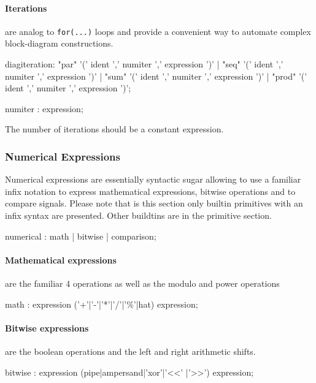 \documentclass{article}
\begin{document}
 
\paragraph{Iterations} are analog to \lstinline'for(...)' loops and provide a convenient way to automate complex block-diagram constructions. 
 
      
\begin{rail}
diagiteration: "par" '(' ident ',' numiter ',' expression ')'
           | "seq" '(' ident ',' numiter ',' expression ')'
           | "sum" '(' ident ',' numiter ',' expression ')'
           | "prod" '(' ident ',' numiter ',' expression ')';
           
numiter : expression;

\end{rail}
The number of iterations should be a constant expression. 



\subsubsection{Numerical Expressions}

Numerical expressions are essentially syntactic sugar allowing to use a familiar infix notation to express mathematical expressions, bitwise operations and to compare signals. Please note that is this section only builtin primitives with an infix syntax are presented. Other buildtins are in the primitive section. 

\begin{rail}
numerical : math | bitwise | comparison;
\end{rail}

\paragraph{Mathematical expressions} are the familiar 4 operations as well as the modulo and power operations
\begin{rail}
math : expression ('+'|'-'|'*'|'/'|'\%'|hat) expression;
\end{rail}
 

\paragraph{Bitwise expressions} are the boolean operations and the left and right arithmetic shifts.

\begin{rail}
bitwise : expression (pipe|ampersand|'xor'|'<<' |'>>') expression;
\end{rail}
\end{document}
